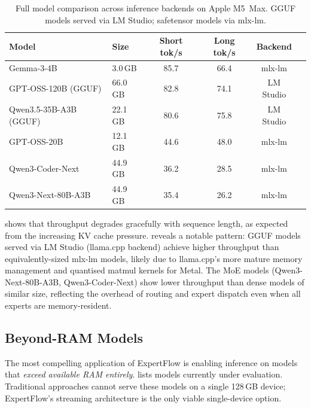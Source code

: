 \documentclass[11pt,a4paper]{article}
\begin{document}
\begin{table}[t]
\centering
\caption{Full model comparison across inference backends on Apple M5~Max.
  GGUF models served via LM Studio; safetensor models via mlx-lm.}
\label{tab:model-comparison}
\begin{tabular}{llcccl}
\toprule
\textbf{Model} & \textbf{Size} & \textbf{Short tok/s} &
  \textbf{Long tok/s} & \textbf{Backend} \\
\midrule
Gemma-3-4B          &  3.0\,GB & 85.7 & 66.4 & mlx-lm \\
GPT-OSS-120B (GGUF) & 66.0\,GB & 82.8 & 74.1 & LM Studio \\
Qwen3.5-35B-A3B (GGUF) & 22.1\,GB & 80.6 & 75.8 & LM Studio \\
GPT-OSS-20B         & 12.1\,GB & 44.6 & 48.0 & mlx-lm \\
Qwen3-Coder-Next    & 44.9\,GB & 36.2 & 28.5 & mlx-lm \\
Qwen3-Next-80B-A3B  & 44.9\,GB & 35.4 & 26.2 & mlx-lm \\
\bottomrule
\end{tabular}
\end{table}

 shows that throughput degrades gracefully with
sequence length, as expected from the increasing KV cache pressure.
 reveals a notable pattern: GGUF models served via
LM Studio (llama.cpp backend) achieve higher throughput than equivalently-sized
mlx-lm models, likely due to llama.cpp's more mature memory management and
quantised matmul kernels for Metal. The MoE models (Qwen3-Next-80B-A3B,
Qwen3-Coder-Next) show lower throughput than dense models of similar size,
reflecting the overhead of routing and expert dispatch even when all experts
are memory-resident.

\subsection{Beyond-RAM Models}
\label{sec:experiments:beyond}

The most compelling application of ExpertFlow is enabling inference on models
that \emph{exceed available RAM entirely}.  lists models
currently under evaluation. Traditional approaches cannot serve these models on
a single 128\,GB device; ExpertFlow's streaming architecture is the only viable
single-device option.
\end{document}
